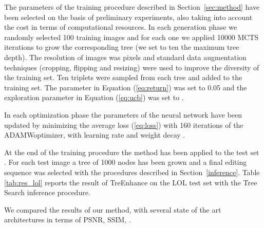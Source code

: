 \documentclass[3p,twocolumn]{elsarticle}
\newcommand{\method}[0]{TreEnhance}
\begin{document}
The parameters of the training procedure described in Section~\ref{sec:method} have been selected on the basis of preliminary experiments, also taking into account the cost in terms of computational resources.  In each generation phase we randomly selected \num{100} training images and for each one we applied \num{10000} MCTS iterations to grow the corresponding tree (we set to ten the maximum tree depth).
The resolution of images was  pixels and standard data augmentation techniques (cropping, flipping and resizing) were used to improve the diversity of the training set.
Ten  triplets were sampled from each tree and added to the training set. The parameter  in Equation (\ref{eq:return}) was set to 0.05 and the exploration parameter  in Equation (\ref{eq:ucb}) was set to .  

In each optimization phase the parameters of the neural network have been updated by minimizing the average loss (\ref{eq:loss}) with 160 iterations of the ADAMWoptimizer, with learning rate  and weight decay .

At the end of the training procedure the method has been applied to the test set . For each test image a tree of \num{1000} nodes has been grown and a final editing sequence was selected with the procedures described in Section~\ref{inference}. Table \ref{tab:res_lol} reports the result of \method{} on the LOL test set with the Tree Search inference procedure.

We compared the results of our method, with several state of the art architectures in terms of PSNR, SSIM, .   \begin{table*}[t]
    \caption{Comparison of state-of-the-art enhancement methods on the LoL dataset.}
    \label{tab:res_lol}
\end{table*}
\end{document}
